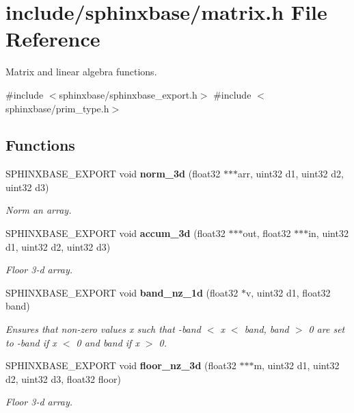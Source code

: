 \section{include/sphinxbase/matrix.h File Reference}
\label{matrix_8h}


Matrix and linear algebra functions.  


{\ttfamily \#include $<$sphinxbase/sphinxbase\+\_\+export.\+h$>$}\newline
{\ttfamily \#include $<$sphinxbase/prim\+\_\+type.\+h$>$}\newline
\subsection*{Functions}
\begin{DoxyCompactItemize}
\item 
S\+P\+H\+I\+N\+X\+B\+A\+S\+E\+\_\+\+E\+X\+P\+O\+RT void \textbf{ norm\+\_\+3d} (float32 $\ast$$\ast$$\ast$arr, uint32 d1, uint32 d2, uint32 d3)
\begin{DoxyCompactList}\small\item\em Norm an array. \end{DoxyCompactList}\item 
S\+P\+H\+I\+N\+X\+B\+A\+S\+E\+\_\+\+E\+X\+P\+O\+RT void \textbf{ accum\+\_\+3d} (float32 $\ast$$\ast$$\ast$out, float32 $\ast$$\ast$$\ast$in, uint32 d1, uint32 d2, uint32 d3)
\begin{DoxyCompactList}\small\item\em Floor 3-\/d array. \end{DoxyCompactList}\item 
S\+P\+H\+I\+N\+X\+B\+A\+S\+E\+\_\+\+E\+X\+P\+O\+RT void \textbf{ band\+\_\+nz\+\_\+1d} (float32 $\ast$v, uint32 d1, float32 band)
\begin{DoxyCompactList}\small\item\em Ensures that non-\/zero values x such that -\/band $<$ x $<$ band, band $>$ 0 are set to -\/band if x $<$ 0 and band if x $>$ 0. \end{DoxyCompactList}\item 
S\+P\+H\+I\+N\+X\+B\+A\+S\+E\+\_\+\+E\+X\+P\+O\+RT void \textbf{ floor\+\_\+nz\+\_\+3d} (float32 $\ast$$\ast$$\ast$m, uint32 d1, uint32 d2, uint32 d3, float32 floor)
\begin{DoxyCompactList}\small\item\em Floor 3-\/d array. \end{DoxyCompactList}\item 

\end{DoxyCompactItemize}
